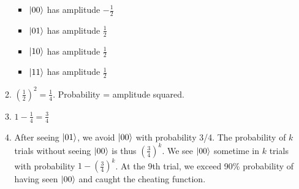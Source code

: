 \documentclass[12pt]{article}
\begin{document}
\begin{enumerate}[font=\bfseries]
\begin{enumerate}
    \begin{itemize}
        \item $\ket{00}$ has amplitude $-\frac{1}{2}$
        \item $\ket{01}$ has amplitude $\frac{1}{2}$
        \item $\ket{10}$ has amplitude $\frac{1}{2}$
        \item $\ket{11}$ has amplitude $\frac{1}{2}$
    \end{itemize}
    \item $(\frac{1}{2})^2 = \frac{1}{4}$. Probability = amplitude squared. 
    \item $1 - \frac{1}{4} = \frac{3}{4}$
    \item After seeing $\ket{01}$, we avoid $\ket{00}$ with probability 3/4.   The probability of $k$ trials without seeing $\ket{00}$ is thus $\left(\frac{3}{4}\right)^{k}$.  We see $\ket{00}$ sometime in $k$ trials with probability $1-\left(\frac{3}{4}\right)^{k}$. At the 9th trial, we exceed 90\% probability of having seen $\ket{00}$ and caught the cheating function.
    \end{enumerate}
\end{enumerate}
\end{document}

